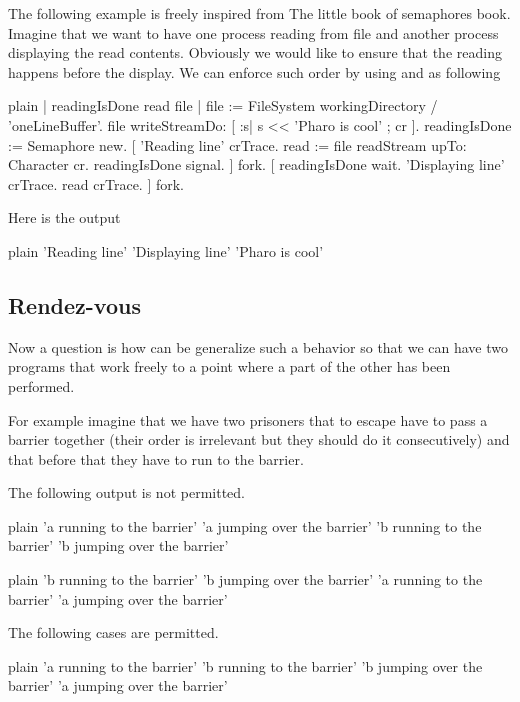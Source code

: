 \documentclass[10pt,twoside,english]{_support/latex/sbabook/sbabook}
\begin{document}
The following example is freely inspired from The little book of semaphores book.
Imagine that we want to have one process reading from file and another process displaying the read contents. 
Obviously we would like to ensure that the reading happens before the display. 
We can enforce such order by using  and  as following

\begin{displaycode}{plain}
| readingIsDone read file |
file := FileSystem workingDirectory / 'oneLineBuffer'.
file writeStreamDo: [ :s| s << 'Pharo is cool' ; cr ].
readingIsDone := Semaphore new. 
[
'Reading line' crTrace.
read := file readStream upTo: Character cr.
readingIsDone signal.
] fork.
[ 
readingIsDone wait.	
'Displaying line' crTrace.
read crTrace.
] fork.
\end{displaycode}

Here is the output

\begin{displaycode}{plain}
'Reading line'
'Displaying line'
'Pharo is cool'
\end{displaycode}
\subsection{Rendez-vous}
Now a question is how can be generalize such a behavior so that we can have two programs that work freely to a point 
where a part of the other has been performed. 
 
For example imagine that we have two prisoners that to escape have to pass a barrier together (their order is irrelevant but they should do it consecutively) and that before that they have to run to the barrier. 

The following output is not permitted. 

\begin{displaycode}{plain}
'a running to the barrier'
'a jumping over the barrier'
'b running to the barrier'
'b jumping over the barrier'
\end{displaycode}

\begin{displaycode}{plain}
'b running to the barrier'
'b jumping over the barrier'
'a running to the barrier'
'a jumping over the barrier'
\end{displaycode}

The following cases are permitted. 

\begin{displaycode}{plain}
'a running to the barrier'
'b running to the barrier'
'b jumping over the barrier'
'a jumping over the barrier'
\end{displaycode}
\end{document}
